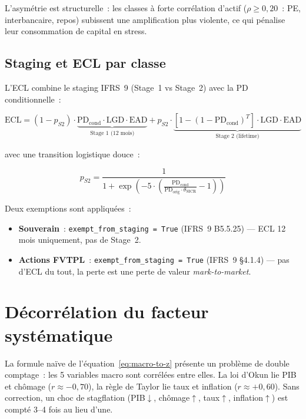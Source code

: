 \documentclass[12pt, a4paper, twoside, openright]{report}
\theoremstyle{definition}
\begin{document}
L'asymétrie est structurelle~: les classes à forte corrélation d'actif ($\rho \geq 0{,}20$~: PE, interbancaire, repos) subissent une amplification plus violente, ce qui pénalise leur consommation de capital en stress.

\subsection{Staging et ECL par classe}

L'ECL combine le staging IFRS~9 (Stage~1 vs Stage~2) avec la PD conditionnelle~:

\begin{equation}
\text{ECL} = (1 - p_{S2}) \cdot \underbrace{\text{PD}_{\text{cond}} \cdot \text{LGD} \cdot \text{EAD}}_{\text{Stage 1 (12 mois)}} + p_{S2} \cdot \underbrace{[1-(1-\text{PD}_{\text{cond}})^T] \cdot \text{LGD} \cdot \text{EAD}}_{\text{Stage 2 (lifetime)}}
\label{eq:ecl-staging-multi}
\end{equation}

\noindent avec une transition logistique douce~:

\begin{equation}
p_{S2} = \frac{1}{1 + \exp\!\left(-5 \cdot \left(\frac{\text{PD}_{\text{cond}}}{\text{PD}_{\text{orig}} \cdot \theta_{\text{SICR}}} - 1\right)\right)}
\label{eq:transition-staging}
\end{equation}

Deux exemptions sont appliquées~:
\begin{itemize}
\item \textbf{Souverain}~: \texttt{exempt\_from\_staging = True} (IFRS~9 B5.5.25) --- ECL 12 mois uniquement, pas de Stage~2.
\item \textbf{Actions FVTPL}~: \texttt{exempt\_from\_staging = True} (IFRS~9 §4.1.4) --- pas d'ECL du tout, la perte est une perte de valeur \textit{mark-to-market}.
\end{itemize}


\section{Décorrélation du facteur systématique}
\label{sec:multi-decorrelation}

La formule naïve de l'équation~\ref{eq:macro-to-z} présente un problème de double comptage~: les 5 variables macro sont corrélées entre elles. La loi d'Okun lie PIB et chômage ($r \approx -0{,}70$), la règle de Taylor lie taux et inflation ($r \approx +0{,}60$). Sans correction, un choc de stagflation (PIB$\downarrow$, chômage$\uparrow$, taux$\uparrow$, inflation$\uparrow$) est compté 3--4 fois au lieu d'une.
\end{document}
